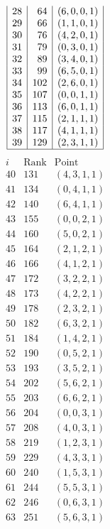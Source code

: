 \documentclass{article}
\begin{document}
{$$\begin{array}{|r|r|r|}
28 & 64 & ( 6, 0, 0, 1 )\\
29 & 66 & ( 1, 1, 0, 1 )\\
30 & 76 & ( 4, 2, 0, 1 )\\
31 & 79 & ( 0, 3, 0, 1 )\\
32 & 89 & ( 3, 4, 0, 1 )\\
33 & 99 & ( 6, 5, 0, 1 )\\
34 & 102 & ( 2, 6, 0, 1 )\\
35 & 107 & ( 0, 0, 1, 1 )\\
36 & 113 & ( 6, 0, 1, 1 )\\
37 & 115 & ( 2, 1, 1, 1 )\\
38 & 117 & ( 4, 1, 1, 1 )\\
39 & 129 & ( 2, 3, 1, 1 )\\
\hline
\end{array}
$$
$$
\begin{array}{|r|r|r|}
\hline
i & \mbox{Rank} & \mbox{Point} \\
\hline
\hline
40 & 131 & ( 4, 3, 1, 1 )\\
41 & 134 & ( 0, 4, 1, 1 )\\
42 & 140 & ( 6, 4, 1, 1 )\\
43 & 155 & ( 0, 0, 2, 1 )\\
44 & 160 & ( 5, 0, 2, 1 )\\
45 & 164 & ( 2, 1, 2, 1 )\\
46 & 166 & ( 4, 1, 2, 1 )\\
47 & 172 & ( 3, 2, 2, 1 )\\
48 & 173 & ( 4, 2, 2, 1 )\\
49 & 178 & ( 2, 3, 2, 1 )\\
50 & 182 & ( 6, 3, 2, 1 )\\
51 & 184 & ( 1, 4, 2, 1 )\\
52 & 190 & ( 0, 5, 2, 1 )\\
53 & 193 & ( 3, 5, 2, 1 )\\
54 & 202 & ( 5, 6, 2, 1 )\\
55 & 203 & ( 6, 6, 2, 1 )\\
56 & 204 & ( 0, 0, 3, 1 )\\
57 & 208 & ( 4, 0, 3, 1 )\\
58 & 219 & ( 1, 2, 3, 1 )\\
59 & 229 & ( 4, 3, 3, 1 )\\
60 & 240 & ( 1, 5, 3, 1 )\\
61 & 244 & ( 5, 5, 3, 1 )\\
62 & 246 & ( 0, 6, 3, 1 )\\
63 & 251 & ( 5, 6, 3, 1 )\\

\end{array}$$}
\end{document}
